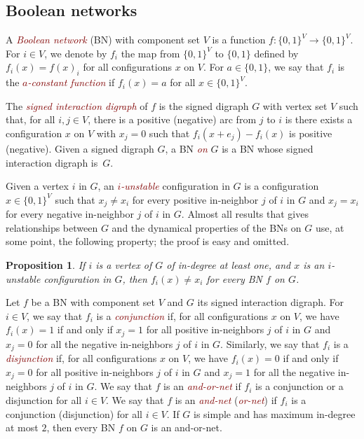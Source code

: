 \documentclass[11pt,letter]{article}
\newtheorem{proposition}{Proposition}
\newcommand{\EM}[1]{{\em\textcolor{Maroon}{#1}}}
\newcommand{\B}{\{0,1\}}
\begin{document}
\subsection{Boolean networks} 

A \EM{Boolean network} (BN) with component set $V$ is a function $f:\B^V\to\B^V$. For $i\in V$, we denote by $f_i$ the map from $\B^V$ to $\B$ defined by $f_i(x)=f(x)_i$ for all configurations $x$ on $V$. For $a\in\B$, we say that $f_i$ is the \EM{$a$-constant function} if $f_i(x)=a$ for all $x\in\B^V$. 

\medskip
The \EM{signed interaction digraph} of $f$ is the signed digraph $G$ with vertex set $V$ such that, for all $i,j\in V$, there is a positive (negative) arc from $j$ to $i$ is there exists a configuration $x$ on $V$ with $x_j=0$ such that $f_i(x+e_j)-f_i(x)$ is positive (negative). Given a signed digraph $G$, a BN \EM{on} $G$ is a BN whose signed interaction digraph is~$G$. 

\medskip
Given a vertex $i$ in $G$, an \EM{$i$-unstable} configuration in $G$ is a configuration $x\in\B^V$ such that $x_j\neq x_i$ for every positive in-neighbor $j$ of $i$ in $G$ and $x_j= x_i$ for every negative in-neighbor $j$ of $i$ in $G$. Almost all results that gives relationships between $G$ and the dynamical properties of the BNs on $G$ use, at some point, the following property; the proof is easy and omitted.  

\begin{proposition}\label{pro:flipping}
If $i$ is a vertex of $G$ of in-degree at least one, and $x$ is an $i$-unstable configuration in $G$, then $f_i(x)\neq x_i$ for every BN $f$ on $G$. 
\end{proposition}

Let $f$ be a BN with component set $V$ and $G$ its signed interaction digraph. For $i\in V$, we say that $f_i$ is a \EM{conjunction} if, for all configurations $x$ on $V$, we have $f_i(x)=1$ if and only if $x_j=1$ for all positive in-neighbors $j$ of $i$ in $G$ and $x_j=0$ for all the negative in-neighbors $j$ of $i$ in $G$. Similarly, we say that $f_i$ is a \EM{disjunction} if, for all configurations $x$ on $V$, we have $f_i(x)=0$ if and only if $x_j=0$ for all positive in-neighbors $j$ of $i$ in $G$ and $x_j=1$ for all the negative in-neighbors $j$ of $i$ in $G$. We say that $f$ is an \EM{and-or-net} if $f_i$ is a conjunction or a disjunction for all $i\in V$. We say that $f$ is an \EM{and-net} (\EM{or-net}) if $f_i$ is a conjunction (disjunction) for all $i\in V$. If $G$ is simple and has maximum in-degree at most $2$, then every BN $f$ on $G$ is an and-or-net.   
\end{document}
